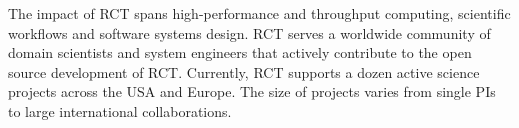 \documentclass[preprint,12pt, a4paper]{elsarticle}
\begin{document}


The impact of RCT spans high-performance and throughput computing, scientific
workflows and software systems design. RCT serves a worldwide community of
domain scientists and system engineers that actively contribute to the open source development of RCT\@. Currently, RCT supports a dozen active science
projects across the USA and Europe. The size of projects varies from single PIs
to large international collaborations.

\end{document}
